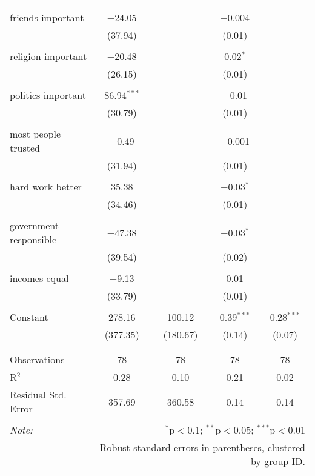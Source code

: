 \documentclass[11pt,]{article}
\begin{document}
\begin{table}[!htbp]
\begin{tabular}{@{\extracolsep{5pt}}lcccc}
  & & & & \\ 
 friends important & $-$24.05 &  & $-$0.004 &  \\ 
  & (37.94) &  & (0.01) &  \\ 
  & & & & \\ 
 religion important & $-$20.48 &  & 0.02$^{*}$ &  \\ 
  & (26.15) &  & (0.01) &  \\ 
  & & & & \\ 
 politics important & 86.94$^{***}$ &  & $-$0.01 &  \\ 
  & (30.79) &  & (0.01) &  \\ 
  & & & & \\ 
 most people trusted & $-$0.49 &  & $-$0.001 &  \\ 
  & (31.94) &  & (0.01) &  \\ 
  & & & & \\ 
 hard work better & 35.38 &  & $-$0.03$^{*}$ &  \\ 
  & (34.46) &  & (0.01) &  \\ 
  & & & & \\ 
 government responsible & $-$47.38 &  & $-$0.03$^{*}$ &  \\ 
  & (39.54) &  & (0.02) &  \\ 
  & & & & \\ 
 incomes equal & $-$9.13 &  & 0.01 &  \\ 
  & (33.79) &  & (0.01) &  \\ 
  & & & & \\ 
 Constant & 278.16 & 100.12 & 0.39$^{***}$ & 0.28$^{***}$ \\ 
  & (377.35) & (180.67) & (0.14) & (0.07) \\ 
  & & & & \\ 
\hline \\[-1.8ex] 
Observations & 78 & 78 & 78 & 78 \\ 
R$^{2}$ & 0.28 & 0.10 & 0.21 & 0.02 \\ 
Residual Std. Error & 357.69 & 360.58 & 0.14 & 0.14 \\ 
\hline 
\hline \\[-1.8ex] 
\textit{Note:}  & \multicolumn{4}{r}{$^{*}$p$<$0.1; $^{**}$p$<$0.05; $^{***}$p$<$0.01} \\ 
 & \multicolumn{4}{r}{Robust standard errors in parentheses, clustered by group ID.} \\ 
\end{tabular} 
\end{table}
\end{document}

